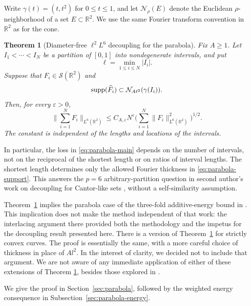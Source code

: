\documentclass{amsart}
\numberwithin{equation}{section}
\newtheorem{theorem}{Theorem}[section]
\newcommand{\wh}{\widehat}
\newcommand{\ZR}{\mathbb{R}}
\newcommand{\supp}{{\rm supp}}
\begin{document}
Write $\gamma(t)=(t,t^2)$ for $0\leq t\leq1$, and let $\mathcal N_\rho(E)$ denote the Euclidean $\rho$-neighborhood of a set $E\subset\ZR^2$. 
We use the same Fourier transform convention in $\ZR^2$ as for the cone.

\begin{theorem}[Diameter-free $\ell^2L^6$ decoupling for the parabola]
\label{thm:parabola}
Fix $A\geq1$. Let $I_1<\cdots<I_N$ be a partition of $[0,1]$ into
nondegenerate intervals, and put
\[
    \ell=\min_{1\leq i\leq N}|I_i|.
\]
Suppose that $F_i\in\mathcal S(\ZR^2)$ and
\begin{equation}
\label{eq:parabola-support}
    \supp(\wh F_i)\subset\mathcal N_{A\ell^2}(\gamma(I_i)).
\end{equation}
Then, for every $\varepsilon>0$,
\begin{equation}
\label{eq:parabola-main}
    \Big\|\sum_{i=1}^N F_i\Big\|_{L^6(\ZR^2)}
    \leq C_{A,\varepsilon}N^\varepsilon
    \Big(\sum_{i=1}^N\|F_i\|_{L^6(\ZR^2)}^2\Big)^{1/2}.
\end{equation}
The constant is independent of the lengths and locations of the
intervals.
\end{theorem}

In particular, the loss in \eqref{eq:parabola-main} depends on the number of intervals, not on the reciprocal of the shortest length or on ratios of interval lengths. 
The shortest length determines only the allowed Fourier thickness in \eqref{eq:parabola-support}.
This answers the $p=6$ arbitrary-partition question in second author's work on decoupling for Cantor-like sets
\cite[Section~1]{Demeter-Cantor}, without a self-similarity assumption.

Theorem~\ref{thm:parabola} implies the parabola case of the three-fold additive-energy bound in \cite{Cushman-Demeter-Wu}.
This implication does not make the method independent of that work: the interlacing argument there provided both the methodology and the impetus for the decoupling  result presented here. 
There is a version of  Theorem~\ref{thm:parabola} for strictly convex curves. 
The proof is essentially the same, with a more careful choice of thickness in place of $Al^2$. 
In the interest of clarity, we decided not to include that argument.
We are not aware of any immediate application of either of these extensions of Theorem \ref{thm:parabola}, besides those explored in \cite{Cushman-Demeter-Wu}.

We give the proof in Section~\ref{sec:parabola}, followed by the weighted energy consequence in Subsection~\ref{sec:parabola-energy}.
\end{document}
